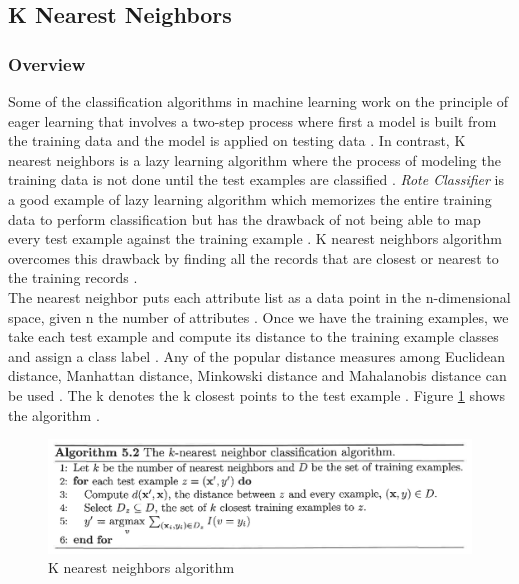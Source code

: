 \documentclass[sigconf]{acmart}
\begin{document}
\subsection{K Nearest Neighbors}

\subsubsection{Overview} Some of the classification algorithms in machine learning work on the principle of eager learning that involves a two-step process where first a model is built from the training data and the model is applied on testing data \cite{book-tan}. In contrast, K nearest neighbors is a lazy learning algorithm where the process of modeling the training data is not done until the test examples are classified \cite{book-tan}. {\em Rote Classifier} is a good example of lazy learning algorithm which memorizes the entire training data to perform classification but has the drawback of not being able to map every test example against the training example \cite{book-tan}. K nearest neighbors algorithm overcomes this drawback by finding all the records that are closest or nearest to the training records \cite{book-tan}. \\

The nearest neighbor puts each attribute list as a data point in the n-dimensional space, given n the number of attributes \cite{book-tan}. Once we have the training examples, we take each test example and compute its distance to the training example classes and assign a class label \cite{book-tan}. Any of the popular distance measures among Euclidean distance, Manhattan distance, Minkowski distance and Mahalanobis distance can be used \cite{book-tan}. The k denotes the k closest points to the test example \cite{book-tan}. Figure \ref{fig:Fig1} shows the algorithm \cite{book-tan}.

\begin{figure}
\includegraphics[width=1.0\columnwidth]{images/fig1.png}
\caption{K nearest neighbors algorithm\cite{book-tan}}
\label{fig:Fig1}
\end{figure}
\end{document}
